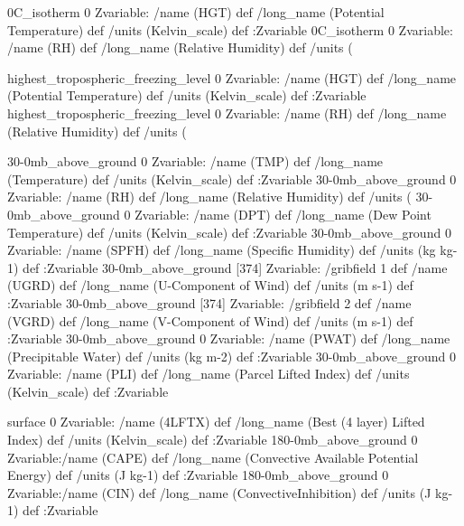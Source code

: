 \begin{ingrid}

0C_isotherm 0 Zvariable: /name (HGT) def /long_name (Potential Temperature) def /units (Kelvin_scale) def :Zvariable
0C_isotherm 0 Zvariable: /name (RH) def /long_name (Relative Humidity) def /units (%

\end{ingrid}
\begin{ingrid}

highest_tropospheric_freezing_level 0 Zvariable: /name (HGT) def /long_name (Potential Temperature) def /units (Kelvin_scale) def :Zvariable
highest_tropospheric_freezing_level 0 Zvariable: /name (RH) def /long_name (Relative Humidity) def /units (%

\end{ingrid}
\begin{ingrid}

30-0mb_above_ground 0 Zvariable: /name (TMP) def /long_name (Temperature) def /units (Kelvin_scale) def :Zvariable
30-0mb_above_ground 0 Zvariable: /name (RH) def /long_name (Relative Humidity) def /units (%
30-0mb_above_ground 0 Zvariable: /name (DPT) def /long_name (Dew Point Temperature) def /units (Kelvin_scale) def :Zvariable
30-0mb_above_ground 0 Zvariable: /name (SPFH) def /long_name (Specific Humidity) def /units (kg kg-1) def :Zvariable
30-0mb_above_ground [374] Zvariable: /gribfield 1 def /name (UGRD) def /long_name (U-Component of Wind) def /units (m s-1) def :Zvariable
30-0mb_above_ground [374] Zvariable: /gribfield 2 def /name (VGRD) def /long_name (V-Component of Wind) def /units (m s-1) def :Zvariable
30-0mb_above_ground 0 Zvariable: /name (PWAT) def /long_name (Precipitable Water) def /units (kg m-2) def :Zvariable
30-0mb_above_ground 0 Zvariable: /name (PLI) def /long_name (Parcel Lifted Index) def /units (Kelvin_scale) def :Zvariable

\end{ingrid}
\begin{ingrid}

surface 0 Zvariable: /name (4LFTX) def /long_name (Best (4 layer) Lifted Index) def /units (Kelvin_scale) def :Zvariable
180-0mb_above_ground  0 Zvariable:/name (CAPE) def /long_name (Convective Available Potential Energy) def /units (J kg-1) def :Zvariable
180-0mb_above_ground  0 Zvariable:/name (CIN) def /long_name (ConvectiveInhibition) def /units (J kg-1) def :Zvariable

\end{ingrid}
